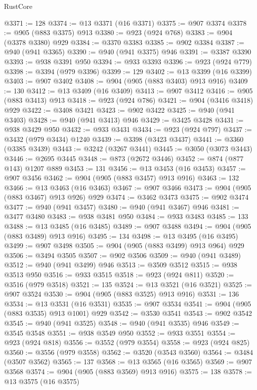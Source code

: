 \begin{lexlean}{RustCore}
\begin{coremodule}
@3371 := 128
@3374 := @13 @3371 (@16 @3371)
@3375 := @907 @3374
@3378 := @905 (@883 @3375) @913
@3380 := @923 (@924 @768)
@3383 := @904 (@3378 @3380) @929
@3384 := @3370 @3383
@3385 := @902 @3384
@3387 := @940 (@941 @3365)
@3390 := @940 (@941 @3375) @946
@3391 := @3387 @3390
@3393 := @938 @3391 @950
@3394 := @933 @3393
@3396 := @923 (@924 @779)
@3398 := @3394 (@979 @3396)
@3399 := 129
@3402 := @13 @3399 (@16 @3399)
@3403 := @907 @3402
@3408 := @904 (@905 (@883 @3403) @913 @916)
@3409 := 130
@3412 := @13 @3409 (@16 @3409)
@3413 := @907 @3412
@3416 := @905 (@883 @3413) @913
@3418 := @923 (@924 @786)
@3421 := @904 (@3416 @3418) @929
@3422 := @3408 @3421
@3423 := @902 @3422
@3425 := @940 (@941 @3403)
@3428 := @940 (@941 @3413) @946
@3429 := @3425 @3428
@3431 := @938 @3429 @950
@3432 := @933 @3431
@3434 := @923 (@924 @797)
@3437 := @3432 (@979 @3434) @1240
@3439 := @3398 (@3423 @3437)
@3441 := @3360 (@3385 @3439)
@3443 := @3242 (@3267 @3441)
@3445 := @3050 (@3073 @3443)
@3446 := @2695 @3445
@3448 := @873 (@2672 @3446)
@3452 := @874 (@877 @143) @1207 @889
@3453 := 131
@3456 := @13 @3453 (@16 @3453)
@3457 := @907 @3456
@3462 := @904 (@905 (@883 @3457) @913 @916)
@3463 := 132
@3466 := @13 @3463 (@16 @3463)
@3467 := @907 @3466
@3473 := @904 (@905 (@883 @3467) @913 @926) @929
@3474 := @3462 @3473
@3475 := @902 @3474
@3477 := @940 (@941 @3457)
@3480 := @940 (@941 @3467) @946
@3481 := @3477 @3480
@3483 := @938 @3481 @950
@3484 := @933 @3483
@3485 := 133
@3488 := @13 @3485 (@16 @3485)
@3489 := @907 @3488
@3494 := @904 (@905 (@883 @3489) @913 @916)
@3495 := 134
@3498 := @13 @3495 (@16 @3495)
@3499 := @907 @3498
@3505 := @904 (@905 (@883 @3499) @913 @964) @929
@3506 := @3494 @3505
@3507 := @902 @3506
@3509 := @940 (@941 @3489)
@3512 := @940 (@941 @3499) @946
@3513 := @3509 @3512
@3515 := @938 @3513 @950
@3516 := @933 @3515
@3518 := @923 (@924 @811)
@3520 := @3516 (@979 @3518)
@3521 := 135
@3524 := @13 @3521 (@16 @3521)
@3525 := @907 @3524
@3530 := @904 (@905 (@883 @3525) @913 @916)
@3531 := 136
@3534 := @13 @3531 (@16 @3531)
@3535 := @907 @3534
@3541 := @904 (@905 (@883 @3535) @913 @1001) @929
@3542 := @3530 @3541
@3543 := @902 @3542
@3545 := @940 (@941 @3525)
@3548 := @940 (@941 @3535) @946
@3549 := @3545 @3548
@3551 := @938 @3549 @950
@3552 := @933 @3551
@3554 := @923 (@924 @818)
@3556 := @3552 (@979 @3554)
@3558 := @923 (@924 @825)
@3560 := @3556 (@979 @3558)
@3562 := @3520 (@3543 @3560)
@3564 := @3484 (@3507 @3562)
@3565 := 137
@3568 := @13 @3565 (@16 @3565)
@3569 := @907 @3568
@3574 := @904 (@905 (@883 @3569) @913 @916)
@3575 := 138
@3578 := @13 @3575 (@16 @3575)

\end{coremodule}
\end{lexlean}
